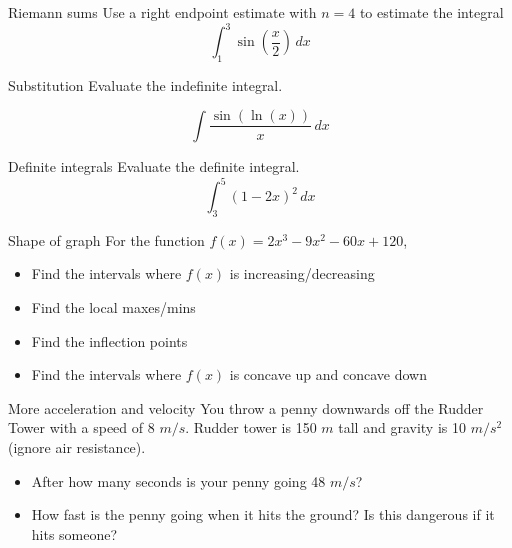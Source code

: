 \documentclass[t]{beamer}
\begin{document}
\begin{frame}{Riemann sums}
Use a right endpoint estimate with $n = 4$ to estimate the integral
$$\int_1^3 \sin\left( \frac{x}{2} \right) \, dx $$
\end{frame}

\begin{frame}{Substitution}
Evaluate the indefinite integral.

$$\int \frac{\sin(\ln(x))}{x} \, dx $$
\end{frame}

\begin{frame}{Definite integrals}
Evaluate the definite integral.
$$\int_3^5 (1 - 2x)^2 \, dx $$
\end{frame}

\begin{frame}{Shape of graph}
For the function $f(x) = 2x^3 - 9x^2 - 60x + 120$,
\begin{itemize}
\item Find the intervals where $f(x)$ is increasing/decreasing
\item Find the local maxes/mins
\item Find the inflection points
\item Find the intervals where $f(x)$ is concave up and
concave down
\end{itemize}

\end{frame}

\begin{frame}{More acceleration and velocity}
You throw a penny downwards off the Rudder Tower with a speed
of 8 $m/s$. Rudder tower is 150 $m$ tall and gravity is 10 $m/s^2$ (ignore
air resistance).

\begin{itemize}
\item After how many seconds is your penny going 48 $m/s$?
\item How fast is the penny going when it hits the ground?  Is this
dangerous if it hits someone?
\end{itemize}
\end{frame}
\end{document}
